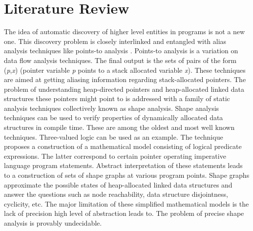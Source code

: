 \documentclass[10pt,a4paper]{report}
\begin{document}
\section{Literature Review}
\label{dcp_literature_review}
\quad The idea of automatic discovery of higher level entities in programs is not a new one. This discovery problem is closely interlinked and entangled with alias analysis techniques \cite{Muchnick:1998:ACD:286076} like points-to analysis \cite{Emami:1994:CIP:178243.178264}. Points-to analysis is a variation on data flow analysis techniques. The final output is the sets of pairs of the form (\textit{p},\textit{x}) (pointer variable \textit{p} points to a stack allocated variable \textit{x}). These techniques are aimed at getting aliasing information regarding stack-allocated pointers.\newline\null
\quad The problem of understanding heap-directed pointers and heap-allocated linked data structures these pointers might point to is addressed with a family of static analysis techniques collectively known as shape analysis. Shape analysis techniques can be used to verify properties of dynamically allocated data structures in compile time. These are among the oldest and most well known techniques. Three-valued logic \cite{Sagiv:1999:PSA:292540.292552}\cite{Wilhelm:2000:SA:647476.760384} can be used as an example. The technique proposes a construction of a mathematical model consisting of logical predicate expressions. The latter correspond to certain pointer operating imperative language program statements. Abstract interpretation of these statements leads to a construction of sets of shape graphs at various program points. Shape graphs approximate the possible states of heap-allocated linked data structures and answer the questions such as node reachability, data structure disjointness, cyclicity, etc. The major limitation of these simplified mathematical models is the lack of precision high level of abstraction leads to. The problem of precise shape analysis is provably undecidable.\newline\null
\end{document}
